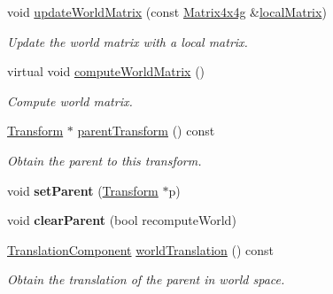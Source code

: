 \begin{Indent}
\begin{DoxyCompactItemize}
void \mbox{\hyperlink{classrev_1_1_transform_aeb3a1d98c804b628c9c43671a5be3722}{update\+World\+Matrix}} (const \mbox{\hyperlink{classrev_1_1_square_matrix}{Matrix4x4g}} \&\mbox{\hyperlink{classrev_1_1_transform_a3ff4acf39a7481c0c1f3c0318738013f}{local\+Matrix}})
\begin{DoxyCompactList}\small\item\em Update the world matrix with a local matrix. \end{DoxyCompactList}\item 
\mbox{\label{classrev_1_1_transform_a8353e9298f7da7e20ea61de968de4ec7}} 
virtual void \mbox{\hyperlink{classrev_1_1_transform_a8353e9298f7da7e20ea61de968de4ec7}{compute\+World\+Matrix}} ()
\begin{DoxyCompactList}\small\item\em Compute world matrix. \end{DoxyCompactList}\item 
\mbox{\label{classrev_1_1_transform_a2d3a482ab49f55ace80bcdc25fe70207}} 
\mbox{\hyperlink{classrev_1_1_transform}{Transform}} $\ast$ \mbox{\hyperlink{classrev_1_1_transform_a2d3a482ab49f55ace80bcdc25fe70207}{parent\+Transform}} () const
\begin{DoxyCompactList}\small\item\em Obtain the parent to this transform. \end{DoxyCompactList}\item 
\mbox{\label{classrev_1_1_transform_a8c96151774f4b113446eae5e18927d69}} 
void {\bfseries set\+Parent} (\mbox{\hyperlink{classrev_1_1_transform}{Transform}} $\ast$p)
\item 
\mbox{\label{classrev_1_1_transform_a3682d8d1e3b7486a1c1049822f3ef31b}} 
void {\bfseries clear\+Parent} (bool recompute\+World)
\item 
\mbox{\label{classrev_1_1_transform_ae3f63d30c7dbf8bc749b9fad194212f9}} 
\mbox{\hyperlink{classrev_1_1_translation_component}{Translation\+Component}} \mbox{\hyperlink{classrev_1_1_transform_ae3f63d30c7dbf8bc749b9fad194212f9}{world\+Translation}} () const
\begin{DoxyCompactList}\small\item\em Obtain the translation of the parent in world space. \end{DoxyCompactList}\end{DoxyCompactItemize}
\end{Indent}
